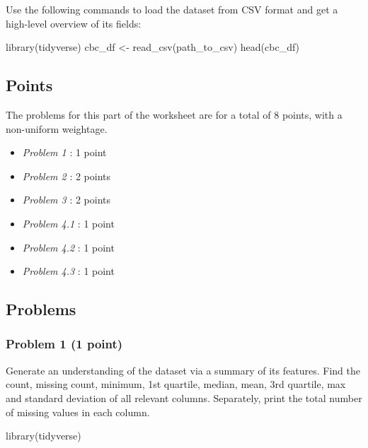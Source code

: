 \documentclass[
]{article}
\newenvironment{Shaded}{\begin{snugshade}}{\end{snugshade}}
\newcommand{\FunctionTok}[1]{\textcolor[rgb]{0.00,0.00,0.00}{#1}}
\newcommand{\NormalTok}[1]{#1}
\newcommand{\OtherTok}[1]{\textcolor[rgb]{0.56,0.35,0.01}{#1}}
\providecommand{\tightlist}{%
  \setlength{\itemsep}{0pt}\setlength{\parskip}{0pt}}
\begin{document}
Use the following commands to load the dataset from CSV format and get a
high-level overview of its fields:

\begin{Shaded}
\begin{Highlighting}[]
\FunctionTok{library}\NormalTok{(tidyverse)}
\NormalTok{cbc\_df }\OtherTok{\textless{}{-}} \FunctionTok{read\_csv}\NormalTok{(path\_to\_csv)}
\FunctionTok{head}\NormalTok{(cbc\_df)}
\end{Highlighting}
\end{Shaded}

\hypertarget{points}{%
\subsection{Points}\label{points}}

The problems for this part of the worksheet are for a total of 8 points,
with a non-uniform weightage.

\begin{itemize}
\tightlist
\item
  \emph{Problem 1} : 1 point
\item
  \emph{Problem 2} : 2 points
\item
  \emph{Problem 3} : 2 points
\item
  \emph{Problem 4.1} : 1 point
\item
  \emph{Problem 4.2} : 1 point
\item
  \emph{Problem 4.3} : 1 point
\end{itemize}

\hypertarget{problems}{%
\subsection{Problems}\label{problems}}

\hypertarget{problem-1-1-point}{%
\subsubsection{Problem 1 (1 point)}\label{problem-1-1-point}}

Generate an understanding of the dataset via a summary of its features.
Find the count, missing count, minimum, 1st quartile, median, mean, 3rd
quartile, max and standard deviation of all relevant columns.
Separately, print the total number of missing values in each column.

\begin{Shaded}
\begin{Highlighting}[]
\FunctionTok{library}\NormalTok{(tidyverse)}
\end{Highlighting}
\end{Shaded}
\end{document}
